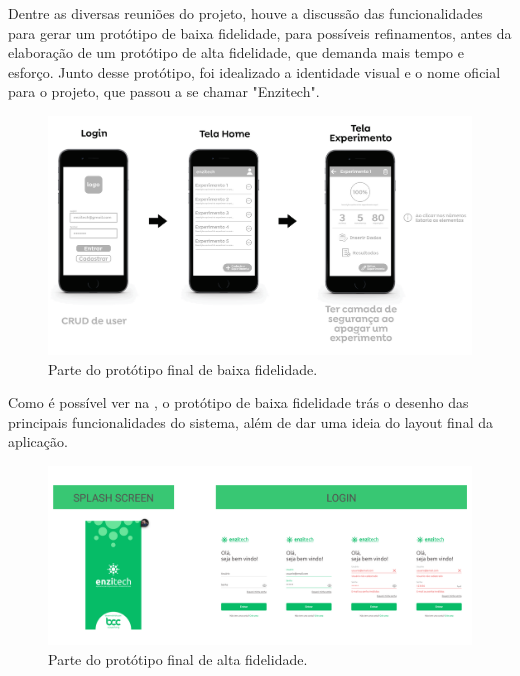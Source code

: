 Dentre as diversas reuniões do projeto, houve a discussão das funcionalidades para gerar um protótipo de baixa fidelidade, para possíveis refinamentos, antes da elaboração de um protótipo de alta fidelidade, que demanda mais tempo e esforço. Junto desse protótipo, foi idealizado a identidade visual e o nome oficial para o projeto, que passou a se chamar "Enzitech".

\begin{figure}[H]
\centering
  \includegraphics[width=\columnwidth]{images/prototipo_baixa.png}
  \caption{Parte do protótipo final de baixa fidelidade.}
  \label{fig:prototipo_baixa}
\end{figure}

Como é possível ver na , o protótipo de baixa fidelidade trás o desenho das principais funcionalidades do sistema, além de dar uma ideia do layout final da aplicação.

\begin{figure}[H]
\centering
  \includegraphics[width=\columnwidth]{images/exemplo_prototipo_alta.png}
  \caption{Parte do protótipo final de alta fidelidade.}
  \label{fig:exemplo_prototipo_alta}
\end{figure}

